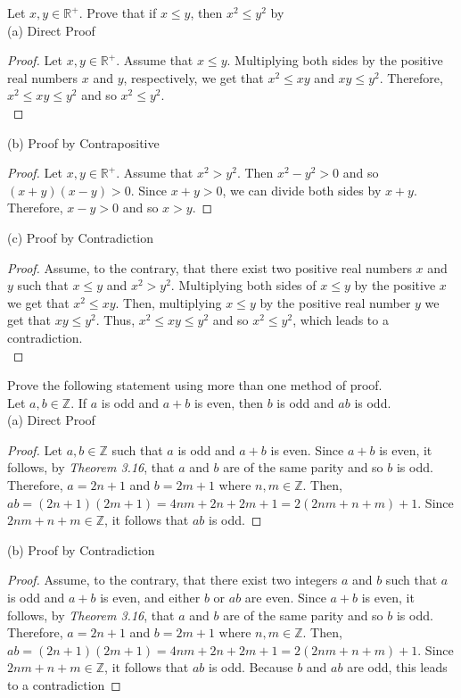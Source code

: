 \documentclass[12pt]{article}
\newcommand{\Z}{\mathbb{Z}}
\newcommand{\R}{\mathbb{R}}
\newenvironment{problem}[2][Problem]{\begin{trivlist}
		\item[\hskip \labelsep {\bfseries #1}\hskip \labelsep {\bfseries #2.}]}{\end{trivlist}}
\begin{document}
	\begin{problem}{37}
		Let $x,y \in \R^{+}$. Prove that if $x\leq y$, then $x^{2}\leq y^{2}$ by\\
		
		(a) Direct Proof
		
	\begin{proof}
		Let $x,y \in \R^{+}$. Assume that $x \leq y$. Multiplying both sides by the positive real numbers $x$ and $y$, respectively, we get that $x^{2} \leq xy$ and $xy \leq y^{2}$. Therefore, $x^{2} \leq xy \leq y^{2}$ and so $x^{2} \leq y^{2}$.\\
	\end{proof}

	(b) Proof by Contrapositive
	\begin{proof}
		Let $x,y \in \R^{+}$. Assume that $x^{2} > y^{2}$. Then $x^{2} - y^{2} > 0$ and so $(x+y)(x-y) >0$. Since $x+y>0$, we can divide both sides by $x+y$. Therefore, $x-y>0$ and so $x>y$.
	\end{proof}

	(c) Proof by Contradiction
	\begin{proof}
		Assume, to the contrary, that there exist two positive real numbers $x$ and $y$ such that $x\leq y$ and $x^{2} > y^{2}$. Multiplying both sides of $x \leq y$ by the positive $x$ we get that $x^{2} \leq xy$. Then, multiplying $x\leq y$ by the positive real number $y$ we get that $xy \leq y^{2}$. Thus, $x^{2} \leq xy \leq y^{2}$ and so $x^{2} \leq y^{2}$, which leads to a contradiction.\\
	\end{proof}
	\end{problem}

	\begin{problem}{38}
		Prove the following statement using more than one method of proof.\\
		Let $a,b\in \Z$. If $a$ is odd and $a+b$ is even, then $b$ is odd and $ab$ is odd.\\
		
		(a) Direct Proof
		\begin{proof}
			Let $a,b \in \Z$ such that $a$ is odd and $a+b$ is even. Since $a+b$ is even, it follows, by \textit{Theorem 3.16}, that $a$ and $b$ are of the same parity and so $b$ is odd. Therefore, $a = 2n+1$ and $b = 2m+1$ where $n,m\in \Z$. Then, $ab = (2n+1)(2m+1) = 4nm+2n+2m+1 = 2(2nm+n+m)+1$. Since $2nm+n+m \in \Z$, it follows that $ab$ is odd.
		\end{proof}
	
		(b) Proof by Contradiction
		\begin{proof}
			Assume, to the contrary, that there exist two integers $a$ and $b$ such that $a$ is odd and $a+b$ is even, and either $b$ or $ab$ are even. Since $a+b$ is even, it follows, by \textit{Theorem 3.16}, that $a$ and $b$ are of the same parity and so $b$ is odd. Therefore, $a = 2n+1$ and $b = 2m+1$ where $n,m\in \Z$. Then, $ab = (2n+1)(2m+1) = 4nm+2n+2m+1 = 2(2nm+n+m)+1$. Since $2nm+n+m \in \Z$, it follows that $ab$ is odd. Because $b$ and $ab$ are odd, this leads to a contradiction
		\end{proof}
	\end{problem}
\end{document}

